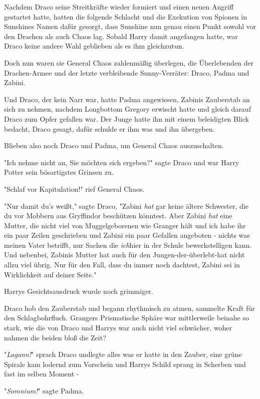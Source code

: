 {Nachdem Draco seine Streitkräfte wieder formiert und einen neuen Angriff gestartet hatte, hatten die folgende Schlacht und die Exekution von Spionen in Sunshines Namen dafür gesorgt, dass Sunshine nun genau einen Punkt sowohl vor den Drachen als auch Chaos lag. Sobald Harry damit angefangen hatte, war Draco keine andere Wahl geblieben als es ihm gleichzutun.

Doch nun waren sie General Chaos zahlenmäßig überlegen, die Überlebenden der Drachen-Armee und der letzte verbleibende Sunny-Verräter: Draco, Padma und Zabini.

Und Draco, der kein Narr war, hatte Padma angewiesen, Zabinis Zauberstab an sich zu nehmen, nachdem Longbottom Gregory erwischt hatte und gleich darauf Draco zum Opfer gefallen war. Der Junge hatte ihn mit einem beleidigten Blick bedacht, Draco gesagt, dafür schulde er ihm was und ihn übergeben.

Blieben also noch Draco und Padma, um General Chaos auszuschalten.

"Ich nehme nicht an, Sie möchten sich ergeben?" sagte Draco und war Harry Potter sein bösartigstes Grinsen zu.

"Schlaf vor Kapitulation!" rief General Chaos.

"Nur damit du's weißt," sagte Draco, "Zabini \emph{hat} gar keine ältere Schwester, die du vor Mobbern aus Gryffindor beschützen könntest. Aber Zabini \emph{hat} eine Mutter, die nicht viel von Muggelgeborenen wie Granger hält und ich habe ihr ein paar Zeilen geschrieben und Zabini ein paar Gefallen angeboten - nichts was meinen Vater betrifft, nur Sachen die \emph{ich}hier in der Schule bewerkstelligen kann. Und nebenbei, Zabinis Mutter hat auch für den Jungen-der-überlebt-hat nicht allzu viel übrig. Nur für den Fall, dass du immer noch dachtest, Zabini sei in Wirklichkeit auf deiner Seite."

Harrys Gesichtsausdruck wurde noch grimmiger.

Draco hob den Zauberstab und begann rhythmisch zu atmen, sammelte Kraft für den Schlagbohrfluch. Grangers Prismatische Sphäre war mittlerweile beinahe so stark, wie die von Draco und Harrys war auch nicht viel schwächer, woher nahmen die beiden bloß die Zeit?

"\emph{Lagann!}" sprach Draco undlegte alles was er hatte in den Zauber, eine grüne Spirale kam lodernd zum Vorschein und Harrys Schild sprang in Scherben und fast im selben Moment -

"\emph{Somnium!}" sagte Padma.

}
